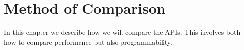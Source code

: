 \chapter{Method of Comparison}\label{ch:method_of_comparison}
\begin{chaptermeta}
In this chapter we describe how we will compare the \glspl{API}.
This involves both how to compare performance but also programmability. 
\end{chaptermeta}




